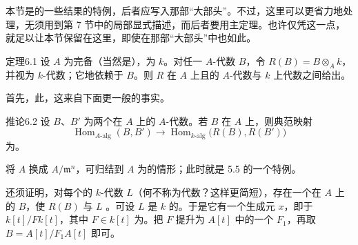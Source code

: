 本节是的一些结果的特例，后者应写入那部“大部头”。不过，这里可以更省力地处理，无须用到第 7 节中的局部显式描述，而后者要用主定理。也许仅凭这一点，就足以让本节保留在这里，即使在那部“大部头”中也如此。
\begin{SGAresult}{定理}{6.1}
设 $A$ 为完备（当然是），为 $k$。对任一 $A$-代数 $B$，令 $R(B)=B\otimes_A k$，并视为 $k$-代数；它地依赖于 $B$。则 $R$ 在 $A$ 上且的 $A$-代数与 $k$ 上代数之间给出。
\end{SGAresult}
首先，此，这来自下面更一般的事实。
\begin{SGAresult}{推论}{6.2}
设 $B$、$B'$ 为两个在 $A$ 上的 $A$-代数。若 $B$ 在 $A$ 上，则典范映射
\[
 \operatorname{Hom}_{A\text{-alg}}(B,B')\longrightarrow
 \operatorname{Hom}_{k\text{-alg}}\bigl(R(B),R(B')\bigr)
\]
为。
\end{SGAresult}
将 $A$ 换成 $A/\mathfrak m^n$，可归结到 $A$ 为的情形；此时就是 5.5 的一个特例。

还须证明，对每个的 $k$-代数 $L$（何不称为代数？这样更简短），存在一个在 $A$ 上的 $B$，使 $R(B)$ 与 $L$ 。可设 $L$ 是 $k$ 的。于是它有一个生成元 $x$，即于 $k[t]/Fk[t]$，其中 $F\in k[t]$ 为。把 $F$ 提升为 $A[t]$ 中的一个 $F_1$，再取 $B=A[t]/F_1A[t]$ 即可。


